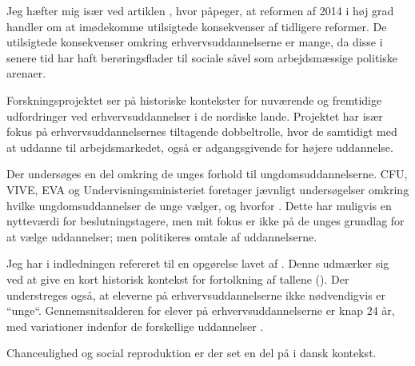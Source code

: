 Jeg hæfter mig især ved artiklen , hvor \citeauthor{jorgensenReformenAfErhvervsuddannelserne2016} påpeger, at reformen af 2014 i høj grad handler om at imødekomme utilsigtede konsekvenser af tidligere reformer.
De utilsigtede konsekvenser omkring erhvervsuddannelserne er mange, da disse i senere tid har haft berøringsflader til sociale såvel som arbejdsmæssige politiske arenaer.

Forskningsprojektet  ser på historiske kontekster for nuværende og fremtidige udfordringer ved erhvervsuddannelser i de nordiske lande.
Projektet har især fokus på erhvervsuddannelsernes tiltagende dobbeltrolle, hvor de samtidigt med at uddanne til arbejdsmarkedet, også er adgangsgivende for højere uddannelse.

Der undersøges en del omkring de unges forhold til ungdomsuddannelserne.
CFU, VIVE, EVA og Undervisningsministeriet foretager jævnligt undersøgelser omkring hvilke ungdomsuddannelser de unge vælger, og hvorfor \autocite[se fx.][]{undervisningsministerietOg10Klasseelevernes2017, borne-ogundervisningsministerietHvemOgHvor, danmarksstatistikErhvervsuddannelserDanmark20192019}.
Dette har muligvis en nytteværdi for beslutningstagere, men mit fokus er ikke på de unges grundlag for at vælge uddannelser; men politikeres omtale af uddannelserne.

Jeg har i indledningen refereret til en opgørelse lavet af \citeauthor{danmarksstatistikErhvervsuddannelserDanmark20192019}.
Denne udmærker sig ved at give en kort historisk kontekst for fortolkning af tallene (\citeyear[s. 8ff]{danmarksstatistikErhvervsuddannelserDanmark20192019}).
Der understreges også, at eleverne på erhvervsuddannelserne ikke nødvendigvis er “unge“.
Gennemsnitsalderen for elever på erhvervsuddannelserne er knap 24 år, med variationer indenfor de forskellige uddannelser \autocite[s. 14]{danmarksstatistikErhvervsuddannelserDanmark20192019}.

Chanceulighed og social reproduktion er der set en del på i dansk kontekst.

